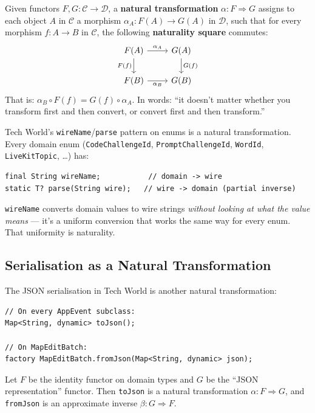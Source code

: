 \documentclass[12pt,a4paper]{article}
\theoremstyle{definition}
\theoremstyle{plain}
\theoremstyle{remark}
\begin{document}
\begin{formal}
Given functors $F, G \colon \mathcal{C} \to \mathcal{D}$, a
\textbf{natural transformation} $\alpha \colon F \Rightarrow G$
assigns to each object $A$ in $\mathcal{C}$ a morphism
$\alpha_A \colon F(A) \to G(A)$ in $\mathcal{D}$, such that for every
morphism $f \colon A \to B$ in $\mathcal{C}$, the following
\textbf{naturality square} commutes:
\[
\begin{tikzcd}
F(A) \arrow[r, "\alpha_A"] \arrow[d, "F(f)"'] & G(A) \arrow[d, "G(f)"] \\
F(B) \arrow[r, "\alpha_B"'] & G(B)
\end{tikzcd}
\]
That is: $\alpha_B \circ F(f) = G(f) \circ \alpha_A$.
In words: ``it doesn't matter whether you transform first and then convert,
or convert first and then transform.''
\end{formal}

\begin{youknow}
Tech World's \texttt{wireName}/\texttt{parse} pattern on enums is a
natural transformation.
Every domain enum (\texttt{CodeChallengeId}, \texttt{PromptChallengeId},
\texttt{WordId}, \texttt{LiveKitTopic}, \ldots) has:
\begin{lstlisting}
final String wireName;           // domain -> wire
static T? parse(String wire);   // wire -> domain (partial inverse)
\end{lstlisting}
\texttt{wireName} converts domain values to wire strings \emph{without
looking at what the value means} --- it's a uniform conversion that
works the same way for every enum. That uniformity is naturality.
\end{youknow}

\subsection{Serialisation as a Natural Transformation}

The JSON serialisation in Tech World is another natural transformation:
\begin{lstlisting}
// On every AppEvent subclass:
Map<String, dynamic> toJson();

// On MapEditBatch:
factory MapEditBatch.fromJson(Map<String, dynamic> json);
\end{lstlisting}

Let $F$ be the identity functor on domain types and $G$ be the
``JSON representation'' functor. Then \texttt{toJson} is a natural
transformation $\alpha \colon F \Rightarrow G$, and \texttt{fromJson}
is an approximate inverse $\beta \colon G \Rightarrow F$.
\end{document}
